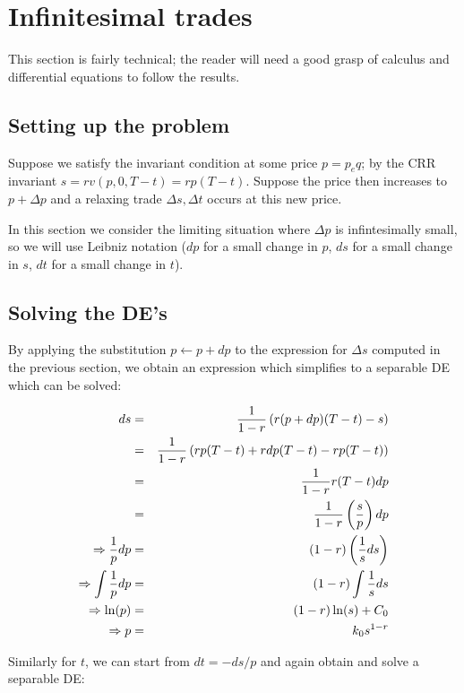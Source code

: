 \documentclass{article}
\begin{document}
\section{Infinitesimal trades}

This section is fairly technical; the reader will need a good grasp of
calculus and differential equations to follow the results.

\subsection{Setting up the problem}

Suppose we satisfy the invariant condition at some price
$p = p_eq$; by the CRR invariant $s = r v( p, 0, T-t) = r p (T-t)$.
Suppose the price then increases to $p + \Delta p$ and a relaxing trade
$\Delta s, \Delta t$ occurs at this new price.

In this section we consider the limiting situation where $\Delta p$ is
infintesimally small, so we will use Leibniz notation ($dp$ for a small change
in $p$, $ds$ for a small change in $s$, $dt$ for a small change in $t$).

\subsection{Solving the DE's}

By applying the substitution $p \gets p + dp$ to the expression for $\Delta s$
computed in the previous section, we obtain an expression which simplifies
to a separable DE which can be solved:

\begin{eqnarray*}
ds & = & {1 \over 1-r} \left( r (p + dp) (T - t) - s \right) \\
   & = & {1 \over 1-r} \left( r p (T - t) + r dp (T - t) - r p (T - t) \right) \\
   & = & {1 \over 1-r} r (T - t) dp \\
   & = & {1 \over 1-r} \left( {s \over p} \right) dp \\
\Rightarrow {1 \over p} dp & = & (1-r) \left( {1 \over s} ds \right) \\
\Rightarrow \int {1 \over p} dp & = & (1-r) \int {1 \over s} ds \\
\Rightarrow \ln(p) & = & (1-r) \ln(s) + C_0 \\
\Rightarrow p & = & k_0 s^{1-r}
\end{eqnarray*}

Similarly for $t$, we can start from $dt = -ds / p$ and again obtain and solve
a separable DE:
\end{document}
